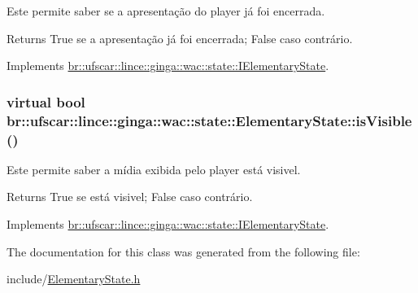 Este permite saber se a apresentação do player já foi encerrada. 

\begin{DoxyReturn}{Returns}
True se a apresentação já foi encerrada; False caso contrário. 
\end{DoxyReturn}


Implements \hyperlink{classbr_1_1ufscar_1_1lince_1_1ginga_1_1wac_1_1state_1_1IElementaryState_a2d7a7f8c9945df9ad15d87863a1d288e}{br::ufscar::lince::ginga::wac::state::IElementaryState}.

\hypertarget{classbr_1_1ufscar_1_1lince_1_1ginga_1_1wac_1_1state_1_1ElementaryState_a2e7a6f98a2b3a239f9b14f22025fc379}{
\subsubsection[{isVisible}]{\setlength{\rightskip}{0pt plus 5cm}virtual bool br::ufscar::lince::ginga::wac::state::ElementaryState::isVisible ()}}
\label{classbr_1_1ufscar_1_1lince_1_1ginga_1_1wac_1_1state_1_1ElementaryState_a2e7a6f98a2b3a239f9b14f22025fc379}


Este permite saber a mídia exibida pelo player está visivel. 

\begin{DoxyReturn}{Returns}
True se está visivel; False caso contrário. 
\end{DoxyReturn}


Implements \hyperlink{classbr_1_1ufscar_1_1lince_1_1ginga_1_1wac_1_1state_1_1IElementaryState_a64cd15f7d8434054345243d877ede453}{br::ufscar::lince::ginga::wac::state::IElementaryState}.



The documentation for this class was generated from the following file:\begin{DoxyCompactItemize}
\item 
include/\hyperlink{ElementaryState_8h}{ElementaryState.h}\end{DoxyCompactItemize}
